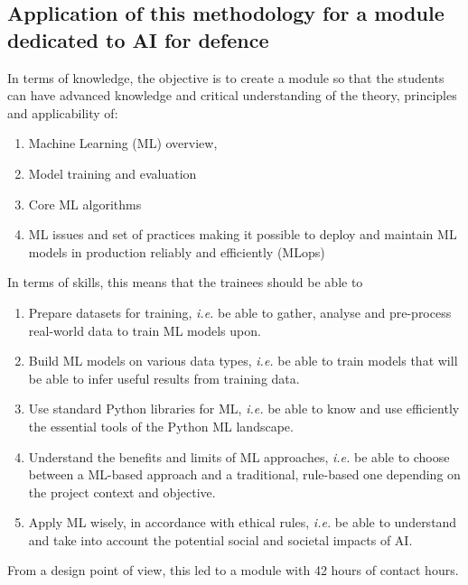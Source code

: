 \documentclass{article}
\begin{document}
\subsection{Application of this methodology for a module dedicated to AI for defence}
In terms of knowledge, the objective is to create a module so that the students can have 
advanced knowledge and critical understanding of the theory, principles and applicability of: 
\begin{enumerate}
    \item Machine Learning (ML) overview,
    \item Model training and evaluation 
\item Core ML algorithms 
\item 
ML issues and set of practices making it possible to deploy and maintain ML models in production reliably and efficiently (MLops)
\end{enumerate}
In terms of skills, this means that the trainees should be able to 
\begin{enumerate}
    \item Prepare datasets for training, \textit{i.e.} be able to gather, analyse and pre-process real-world data to train ML models upon. 
\item Build ML models on various data types, \textit{i.e.} be able to train models that will be able to infer useful results from training data. 
\item Use standard Python libraries for ML, \textit{i.e.} be able to know and use efficiently the essential tools of the Python ML landscape. 
\item Understand the benefits and limits of ML approaches, \textit{i.e.} be able to choose between a ML-based approach and a traditional, rule-based one depending on the project context and objective. 
\item Apply ML wisely, in accordance with ethical rules, \textit{i.e.} be able to understand and take into account the potential social and societal impacts of AI. 
\end{enumerate}
From a design point of view, this led to a module with 42 hours of contact hours.
\end{document}
